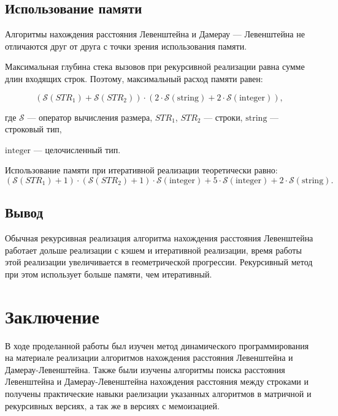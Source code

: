 \documentclass[12pt]{report}
\begin{document}
	\section{Использование памяти}
	
	Алгоритмы нахождения расстояния Левенштейна и Дамерау — Левенштейна не отличаются друг от друга с точки зрения использования памяти.
	
	Максимальная глубина стека вызовов при рекурсивной реализации равна сумме длин входящих строк. Поэтому, максимальный расход памяти равен: 
	
	\begin{equation}
		(\mathcal{S}(STR_1) + \mathcal{S}(STR_2)) \cdot (2 \cdot \mathcal{S}\mathrm{(string)} + 2 \cdot \mathcal{S}\mathrm{(integer)}),
	\end{equation}
	
	\noindent где $\mathcal{S}$ — оператор вычисления размера, $STR_1$, $STR_2$ — строки, $\mathrm{string}$ — строковый тип, 
	
	\noindent $\mathrm{integer}$ — целочисленный тип.
	
	Использование памяти при итеративной реализации теоретически равно:
	\begin{equation}
		(\mathcal{S}(STR_1) + 1) \cdot (\mathcal{S}(STR_2) + 1) \cdot \mathcal{S}\mathrm{(integer)} + 5\cdot \mathcal{S}\mathrm{(integer)} + 2 \cdot \mathcal{S}\mathrm{(string)}.
	\end{equation}
	
	
	\section{Вывод}
	
	Обычная рекурсивная реализация алгоритма нахождения расстояния Левенштейна работает дольше реализации с кэшем и итеративной реализации, время работы этой реализации увеличивается в геометрической прогрессии. Рекурсивный метод при этом использует больше памяти, чем итеративный.
	
	
	\chapter*{Заключение}
	
	В ходе проделанной работы был изучен метод динамического программирования на материале реализации алгоритмов нахождения расстояния Левенштейна и Дамерау-Левенштейна. Также были изучены алгоритмы поиска расстояния Левенштейна и Дамерау-Левенштейна нахождения расстояния между строками и получены практические навыки раелизации указанных алгоритмов в матричной и рекурсивных версиях, а так же в версиях с мемоизацией.
	
\end{document}
